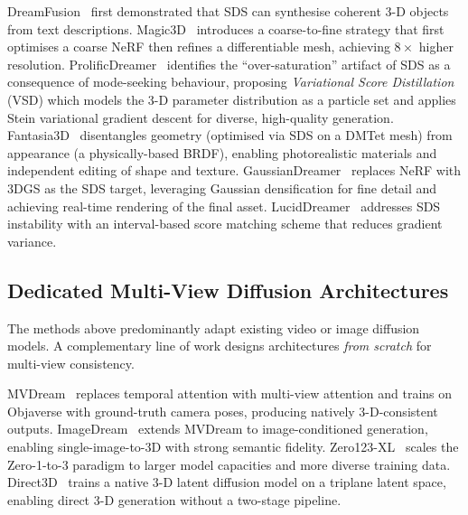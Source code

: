 DreamFusion~\citep{poole2023dreamfusion} first demonstrated that SDS can
synthesise coherent 3-D objects from text descriptions.
Magic3D~\citep{lin2023magic3d} introduces a coarse-to-fine strategy that
first optimises a coarse NeRF then refines a differentiable mesh, achieving
$8\times$ higher resolution.
ProlificDreamer~\citep{wang2023prolificdreamer} identifies the ``over-saturation''
artifact of SDS as a consequence of mode-seeking behaviour, proposing
\emph{Variational Score Distillation} (VSD) which models the 3-D parameter
distribution as a particle set and applies Stein variational gradient descent
for diverse, high-quality generation.
Fantasia3D~\citep{chen2023fantasia3d} disentangles geometry (optimised via
SDS on a DMTet mesh) from appearance (a physically-based BRDF), enabling
photorealistic materials and independent editing of shape and texture.
GaussianDreamer~\citep{yi2024gaussiandreamer} replaces NeRF with 3DGS as the
SDS target, leveraging Gaussian densification for fine detail and achieving
real-time rendering of the final asset.
LucidDreamer~\citep{chung2023luciddreamer} addresses SDS instability with an
interval-based score matching scheme that reduces gradient variance.

\subsection{Dedicated Multi-View Diffusion Architectures}

The methods above predominantly adapt existing video or image diffusion models.
A complementary line of work designs architectures \emph{from scratch} for
multi-view consistency.

MVDream~\citep{shi2023mvdream} replaces temporal attention with multi-view
attention and trains on Objaverse with ground-truth camera poses, producing
natively 3-D-consistent outputs.
ImageDream~\citep{wang2024imagedream} extends MVDream to image-conditioned
generation, enabling single-image-to-3D with strong semantic fidelity.
Zero123-XL~\citep{zero123xl2023} scales the Zero-1-to-3 paradigm to larger
model capacities and more diverse training data.
Direct3D~\citep{wu2024direct3d} trains a native 3-D latent diffusion model
on a triplane latent space, enabling direct 3-D generation without a two-stage
pipeline.

